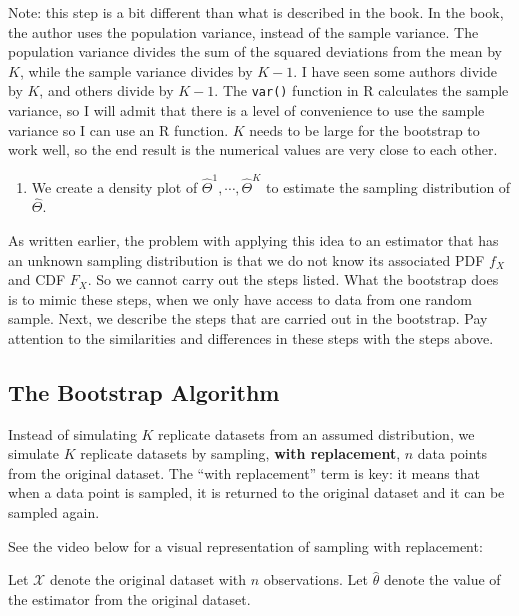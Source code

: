 \documentclass[
]{book}
\providecommand{\tightlist}{%
  \setlength{\itemsep}{0pt}\setlength{\parskip}{0pt}}
\begin{document}
Note: this step is a bit different than what is described in the book. In the book, the author uses the population variance, instead of the sample variance. The population variance divides the sum of the squared deviations from the mean by \(K\), while the sample variance divides by \(K-1\). I have seen some authors divide by \(K\), and others divide by \(K-1\). The \texttt{var()} function in R calculates the sample variance, so I will admit that there is a level of convenience to use the sample variance so I can use an R function. \(K\) needs to be large for the bootstrap to work well, so the end result is the numerical values are very close to each other.

\begin{enumerate}
\def\labelenumi{\arabic{enumi}.}
\setcounter{enumi}{5}
\tightlist
\item
  We create a density plot of \(\hat{\Theta}^{1}, \cdots, \hat{\Theta}^{K}\) to estimate the sampling distribution of \(\hat{\Theta}\).
\end{enumerate}

As written earlier, the problem with applying this idea to an estimator that has an unknown sampling distribution is that we do not know its associated PDF \(f_X\) and CDF \(F_X\). So we cannot carry out the steps listed. What the bootstrap does is to mimic these steps, when we only have access to data from one random sample. Next, we describe the steps that are carried out in the bootstrap. Pay attention to the similarities and differences in these steps with the steps above.

\hypertarget{the-bootstrap-algorithm}{%
\subsection{The Bootstrap Algorithm}\label{the-bootstrap-algorithm}}

Instead of simulating \(K\) replicate datasets from an assumed distribution, we simulate \(K\) replicate datasets by sampling, \textbf{with replacement}, \(n\) data points from the original dataset. The ``with replacement'' term is key: it means that when a data point is sampled, it is returned to the original dataset and it can be sampled again.

See the video below for a visual representation of sampling with replacement:

Let \(\mathcal{X}\) denote the original dataset with \(n\) observations. Let \(\hat{\theta}\) denote the value of the estimator from the original dataset.
\end{document}
